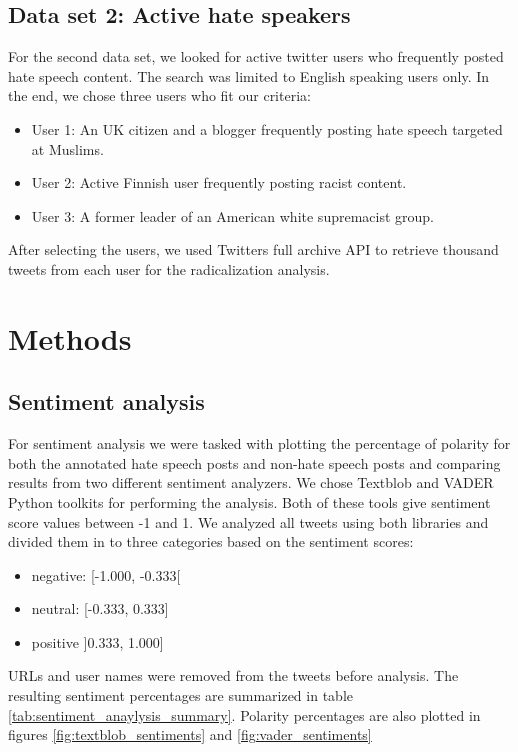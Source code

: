\documentclass[conference]{IEEEtran}
\begin{document}
\subsection{Data set 2: Active hate speakers}
For the second data set, we looked for active twitter users who frequently posted hate speech content. 
The search was limited to English speaking users only. In the end, we chose three users who fit our 
criteria: 
\begin{itemize}
    \item User 1: An UK citizen and a blogger frequently posting hate speech targeted at Muslims.
    \item User 2: Active Finnish user frequently posting racist content.
    \item User 3: A former leader of an American white supremacist group.
\end{itemize}
After selecting the users, we used Twitters full archive API to retrieve thousand tweets from each user for the
radicalization analysis. 
\section{Methods}
\subsection{Sentiment analysis}
For sentiment analysis we were tasked with plotting the percentage of polarity for both the 
annotated hate speech posts and non-hate speech posts and comparing results from two different 
sentiment analyzers. We chose Textblob \cite{python:textblob} and VADER \cite{hutto2014vader,python:vader} Python toolkits for performing the analysis. 
Both of these tools give sentiment score values between -1 and 1. We analyzed all tweets using
both libraries and divided them in to three categories based on the sentiment scores: 

\begin{itemize}
  \item negative:   [-1.000, -0.333[
  \item neutral:    [-0.333,  0.333]
  \item positive    ]0.333, 1.000] 
\end{itemize}

URLs and user names were removed from the tweets before analysis. The resulting sentiment 
percentages are summarized in table \ref{tab:sentiment_anaylysis_summary}. Polarity percentages 
are also plotted in figures \ref{fig:textblob_sentiments} and \ref{fig:vader_sentiments}
\end{document}
